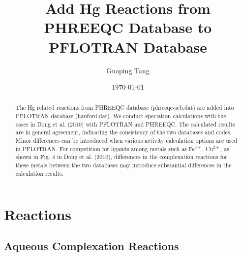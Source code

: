 \documentclass[12pt, a4paper]{article}
\title{Add Hg Reactions from PHREEQC Database to PFLOTRAN Database}
\author{Guoping Tang}
\date\today{}
\begin{document}
\maketitle

\begin{abstract}
The Hg related reactions from PHREEQC database (phreeqc-scb.dat) are added into
PFLOTRAN database (hanford.dat). We conduct speciation calculations with the
cases in Dong et al. (2010) with PFLOTRAN and PHREEQC. The calculated results
are in general agreement, indicating the consistency of the two databases and
codes. Minor differences can be introduced when various activity calculation
options are used in PFLOTRAN. For competition for ligands among metals such as
Fe$^{3+}$, Cu$^{2+}$, as shown in Fig. 4 in Dong et al. (2010), differences in
the complexation reactions for these metals between the two databases may
introduce substantial differences in the calculation results.  
\end{abstract}

\section{Reactions}
\subsection{Aqueous Complexation Reactions}
\end{document}
